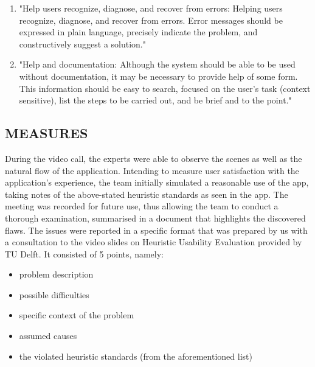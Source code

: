 \begin{enumerate}
\item "Help users recognize, diagnose, and recover from errors: Helping users recognize, diagnose, and recover from errors. Error messages should be expressed in plain language, precisely indicate the problem, and constructively suggest a solution."

\item "Help and documentation: Although the system should be able to be used without documentation, it may be necessary to provide help of some form. This information should be easy to search, focused on the user’s task (context sensitive), list the  steps to be carried out, and be brief and to the point."

\end{enumerate}


\subsection{MEASURES}

During the video call, the experts were able to observe the scenes as well as the natural flow of the application.
Intending to measure user satisfaction with the application's experience, the team initially simulated a reasonable use of the app, taking notes of the above-stated heuristic standards as seen in the app.
The meeting was recorded for future use, thus allowing the team to conduct a thorough examination, summarised in a document that highlights the discovered flaws.
The issues were reported in a specific format that was prepared by us with a consultation to the video slides on Heuristic Usability Evaluation provided by TU Delft. It consisted of 5 points, namely:
\begin{itemize}
    \item problem description 
    \item possible difficulties
    \item specific context of the problem 
    \item assumed causes
    \item the violated heuristic standards (from the aforementioned list)
\end{itemize}

